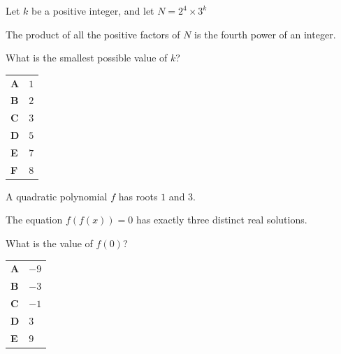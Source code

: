 \documentclass[11pt,a4paper]{article}
\begin{document}
\clearpage
\thispagestyle{djspaper}
\vspace*{8pt}
\begin{enumerate}[label=\textbf{\arabic*.},leftmargin=*,itemsep=0pt,start=15]
\questionitem[Number]
Let $k$ be a positive integer, and let $N=2^4\times3^k$

The product of all the positive factors of $N$ is the fourth power of an integer. 

What is the smallest possible value of $k$?

\par\vspace*{12pt}
\begin{tabularx}{\linewidth}{@{}>{\bfseries}l Y@{}}
A &
$1$
\\[0.8em]
B &
$2$
\\[0.8em]
C &
$3$
\\[0.8em]
D &
$5$
\\[0.8em]
E &
$7$
\\[0.8em]
F &
$8$
\\
\end{tabularx}
\end{enumerate}
\clearpage
\thispagestyle{djspaper}
\vspace*{8pt}
\begin{enumerate}[label=\textbf{\arabic*.},leftmargin=*,itemsep=0pt,start=16]
\questionitem[Polynomials]
A quadratic polynomial $f$ has roots $1$ and $3$.

The equation $f(f(x))=0$ has exactly three distinct real solutions. 

What is the value of $f(0)$?

\par\vspace*{12pt}
\begin{tabularx}{\linewidth}{@{}>{\bfseries}l Y@{}}
A &
$-9$
\\[0.8em]
B &
$-3$
\\[0.8em]
C &
$-1$
\\[0.8em]
D &
$3$
\\[0.8em]
E &
$9$
\\
\end{tabularx}
\end{enumerate}
\end{document}
